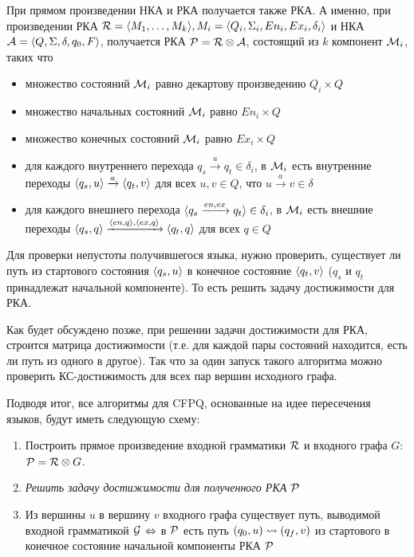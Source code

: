 При прямом произведении НКА и РКА получается также РКА. А именно, при произведении РКА $\mathcal{R} = \langle M_1, \dots, M_k \rangle,  M_i = \langle Q_i, \Sigma_i, En_i, Ex_i, \delta_i \rangle$ и НКА $\mathcal{A} = \langle Q, \Sigma, \delta, q_0, F \rangle$, получается РКА $\mathcal{P} = \mathcal{R} \otimes \mathcal{A}$, состоящий из $k$ компонент $\mathcal{M}_i$, таких что
  \vspace{-\topsep}
  \begin{itemize}
    \setlength\itemsep{-0.1em}
    \item множество состояний $\mathcal{M}_i$ равно декартову произведению $Q_i \times Q$
    \item множество начальных состояний $\mathcal{M}_i$ равно $En_i \times Q$
    \item множество конечных  состояний $\mathcal{M}_i$ равно $Ex_i \times Q$
    \item для каждого внутреннего перехода $q_s \xrightarrow{a} q_t \in \delta_i$, в $\mathcal{M}_i$ есть внутренние переходы $\langle q_s, u \rangle \xrightarrow{a} \langle q_t, v \rangle$ для всех $u, v \in Q$, что $u \xrightarrow{a} v \in \delta$
    \item для каждого внешнего перехода $\langle q_s \xrightarrow{en, ex} q_t \rangle \in \delta_i$, в $\mathcal{M}_i$ есть внешние переходы $\langle q_s, q \rangle \xrightarrow{\langle en, q \rangle, \langle ex, q \rangle} \langle q_t, q \rangle$ для всех $q \in Q$
  \end{itemize}

Для проверки непустоты получившегося языка, нужно проверить, существует ли путь из стартового состояния $\langle q_s, u \rangle$ в конечное состояние $\langle q_t, v \rangle$ ($q_s$ и $q_t$ принадлежат начальной компоненте). То есть решить задачу достижимости для РКА.

Как будет обсуждено позже, при решении задачи достижимости для РКА, строится матрица достижимости (т.е. для каждой пары состояний находится, есть ли путь из одного в другое). Так что за один запуск такого алгоритма можно проверить КС-достижимость для всех пар вершин исходного графа. 

Подводя итог, все алгоритмы для CFPQ, основанные на идее пересечения языков, будут иметь следующую схему:
\begin{enumerate}
    \item Построить прямое произведение входной грамматики $\mathcal{R}$ и входного графа $G$: $\mathcal{P} = \mathcal{R} \otimes G$.
    \item \textit{Решить задачу достижимости для полученного РКА $\mathcal{P}$}
    \item Из вершины $u$ в вершину $v$ входного графа существует путь, выводимой входной грамматикой $\mathcal{G}$ $\Leftrightarrow$ в $\mathcal{P}$ есть путь $(q_0, u) \rightsquigarrow (q_f, v)$ из стартового в конечное состояние начальной компоненты РКА $\mathcal{P}$
\end{enumerate}

